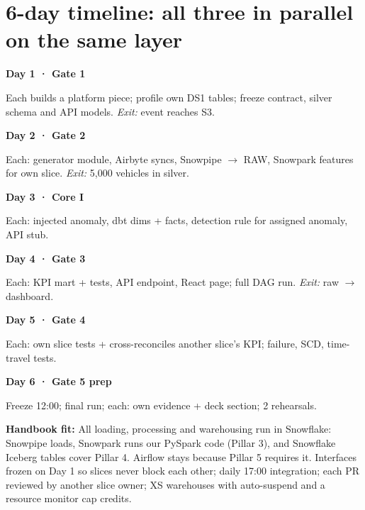 \documentclass[10pt,a4paper]{article}
\begin{document}
\section{6-day timeline: all three in parallel on the same layer}

\begin{tcbraster}[raster columns=6, raster equal height, raster column skip=4pt, enhanced, colback=rowalt, colframe=rowalt, borderline north={1.6pt}{0pt}{blue}, arc=0pt, boxrule=0pt, left=3pt, right=3pt, top=3pt, bottom=3pt, fontupper=\scriptsize\raggedright]
\begin{tcolorbox}{\footnotesize\bfseries\color{navy} Day 1 · Gate 1\par}\vspace{1pt}Each builds a platform piece; profile own DS1 tables; freeze contract, silver schema and API models. \textit{Exit:} event reaches S3.\end{tcolorbox}
\begin{tcolorbox}{\footnotesize\bfseries\color{navy} Day 2 · Gate 2\par}\vspace{1pt}Each: generator module, Airbyte syncs, Snowpipe $\rightarrow$ RAW, Snowpark features for own slice. \textit{Exit:} 5,000 vehicles in silver.\end{tcolorbox}
\begin{tcolorbox}{\footnotesize\bfseries\color{navy} Day 3 · Core I\par}\vspace{1pt}Each: injected anomaly, dbt dims + facts, detection rule for assigned anomaly, API stub.\end{tcolorbox}
\begin{tcolorbox}{\footnotesize\bfseries\color{navy} Day 4 · Gate 3\par}\vspace{1pt}Each: KPI mart + tests, API endpoint, React page; full DAG run. \textit{Exit:} raw $\rightarrow$ dashboard.\end{tcolorbox}
\begin{tcolorbox}{\footnotesize\bfseries\color{navy} Day 5 · Gate 4\par}\vspace{1pt}Each: own slice tests + cross-reconciles another slice's KPI; failure, SCD, time-travel tests.\end{tcolorbox}
\begin{tcolorbox}{\footnotesize\bfseries\color{navy} Day 6 · Gate 5 prep\par}\vspace{1pt}Freeze 12:00; final run; each: own evidence + deck section; 2 rehearsals.\end{tcolorbox}
\end{tcbraster}
\vspace{4pt}
{\footnotesize\color{muted}\textbf{\color{ink}Handbook fit:} All loading, processing and warehousing run in Snowflake: Snowpipe loads, Snowpark runs our PySpark code (Pillar 3), and Snowflake Iceberg tables cover Pillar 4. Airflow stays because Pillar 5 requires it. Interfaces frozen on Day 1 so slices never block each other; daily 17:00 integration; each PR reviewed by another slice owner; XS warehouses with auto-suspend and a resource monitor cap credits.}
\end{document}
